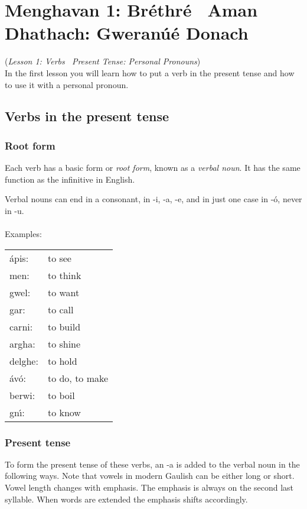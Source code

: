 \section{Menghavan 1: Br\'{e}thr\'{e} \textendash\ Aman Dhathach:  Gweran\'{u}\'{e} Donach}
(\textit{Lesson 1: Verbs  \textendash\ Present Tense: Personal Pronouns})\\

\noindent In the first lesson you will learn how to put a verb in the present tense and how to use it with a personal pronoun.

\subsection{Verbs in the present tense}

\subsubsection{Root form}

\noindent Each verb has a basic form or \textit{root form}, known as a \textit{verbal noun}. It has the same function as the infinitive in English.

\noindent Verbal nouns can end in a consonant, in -i, -a, -e, and in just one case in -\'{o}, never in -u.\\\\
\noindent Examples:
\begin{table}[H]
\begin{tabu}{ll}
\'{a}pis: & to see\\
men: & to think\\
gwel: & to want\\
gar: & to call\\
carni: & to build\\
argha: & to shine\\
delghe: & to hold\\
\'{a}v\'{o}: & to do, to make\\
berwi: & to boil\\
gn\'{\i}: & to know\\
\end{tabu}
\label{examples_verbal_nouns}
\end{table}

\subsubsection{Present tense}

\noindent To form the present tense of these verbs, an -a is added to the verbal noun in the following ways. Note that vowels in modern Gaulish can be either long or short. Vowel length changes with emphasis. The emphasis is always on the second last syllable. When words are extended the emphasis shifts accordingly.\\

